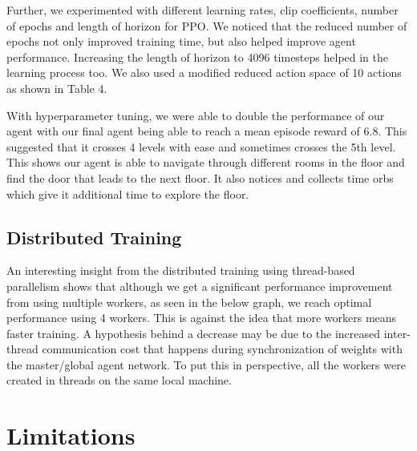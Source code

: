 \documentclass[conference]{IEEEtran}
\begin{document}
Further, we experimented with different learning rates, clip coefficients, number of epochs and length of horizon for PPO. We noticed that the reduced number of epochs not only improved training time, but also helped improve agent performance. Increasing the length of horizon to 4096 timesteps helped in the learning process too. We also used a modified reduced action space of 10 actions as shown in Table 4. 

With hyperparameter tuning, we were able to double the performance of our agent with our final agent being able to reach a mean episode reward of 6.8. This suggested that it crosses 4 levels with ease and sometimes crosses the 5th level. This shows our agent is able to navigate through different rooms in the floor and find the door that leads to the next floor. It also notices and collects time orbs which give it additional time to explore the floor. 

\subsection{Distributed Training}

An interesting insight from the distributed training using thread-based parallelism shows that although we get a significant performance improvement from using multiple workers, as seen in the below graph, we reach optimal performance using 4 workers. This is against the idea that more workers means faster training. A hypothesis behind a decrease may be due to the increased inter-thread communication cost that happens during synchronization of weights with the master/global agent network. To put this in perspective, all the workers were created in threads on the same local machine. 

\section{Limitations}

\end{document}
